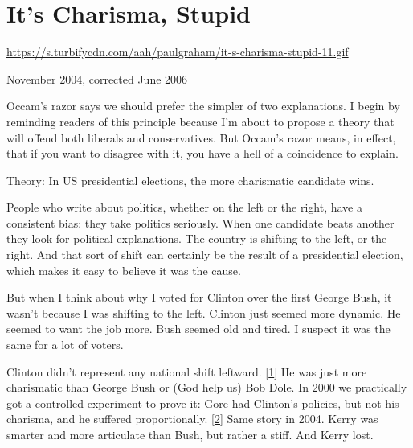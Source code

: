 \chapter{It's Charisma, Stupid}


            
              
                \href{https://s.turbifycdn.com/aah/paulgraham/it-s-charisma-stupid-11.gif}{https://s.turbifycdn.com/aah/paulgraham/it-s-charisma-stupid-11.gif}




                  November 2004, corrected June 2006

Occam's razor
                  says we should prefer the simpler of two explanations. I begin
                  by reminding readers of this principle because I'm about to
                  propose a theory that will offend both liberals and
                  conservatives. But Occam's razor means, in effect, that if you
                  want to disagree with it, you have a hell of a coincidence to
                  explain.

Theory: In US presidential elections, the
                  more charismatic candidate wins.

People who write
                  about politics, whether on the left or the right, have a
                  consistent bias: they take politics seriously. When one
                  candidate beats another they look for political explanations.
                  The country is shifting to the left, or the right. And that
                  sort of shift can certainly be the result of a presidential
                  election, which makes it easy to believe it was the cause.

But
                  when I think about why I voted for Clinton over the first
                  George Bush, it wasn't because I was shifting to the left.
                  Clinton just seemed more dynamic. He seemed to want the job
                  more. Bush seemed old and tired. I suspect it was the same for
                  a lot of voters.

Clinton didn't represent any
                  national shift leftward.
                  [\href{\#f1n}{1}]
                  He was just more charismatic than George Bush or (God help us)
                  Bob Dole. In 2000 we practically got a controlled experiment
                  to prove it: Gore had Clinton's policies, but not his
                  charisma, and he suffered proportionally.
                  [\href{\#f2n}{2}]
                  Same story in 2004. Kerry was smarter and more articulate than
                  Bush, but rather a stiff. And Kerry lost.


